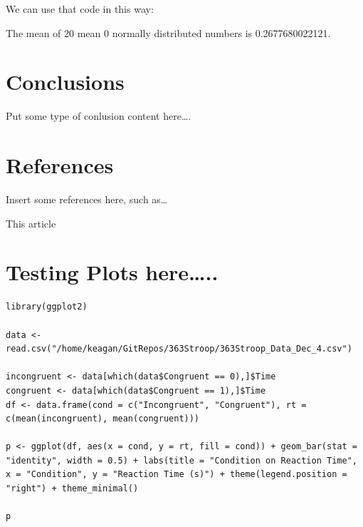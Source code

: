 \documentclass{article}
\begin{document}
We can use that code in this way:

The mean of 20 mean 0 normally distributed numbers is 0.2677680022121.


\section{Conclusions}
\label{sec:orgf5fac26}

Put some type of conlusion content here\ldots{}.



\section{References}
\label{sec:orgcdf8542}

Insert some references here, such as\ldots{}

This article \cite{britt}




\section{Testing Plots here\ldots{}..}
\label{sec:org2382b36}
\begin{verbatim}
library(ggplot2)

data <- read.csv("/home/keagan/GitRepos/363Stroop/363Stroop_Data_Dec_4.csv")

incongruent <- data[which(data$Congruent == 0),]$Time
congruent <- data[which(data$Congruent == 1),]$Time
df <- data.frame(cond = c("Incongruent", "Congruent"), rt = c(mean(incongruent), mean(congruent)))

p <- ggplot(df, aes(x = cond, y = rt, fill = cond)) + geom_bar(stat = "identity", width = 0.5) + labs(title = "Condition on Reaction Time", x = "Condition", y = "Reaction Time (s)") + theme(legend.position = "right") + theme_minimal()

p
\end{verbatim}
\end{document}
